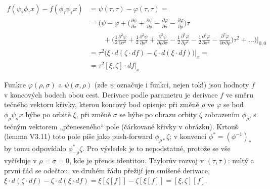 \begin{align*}
  f(\psi_\tau\phi_\tau x) - f(\phi_\tau\psi_\tau x) &= \psi(\tau,\tau) - \varphi(\tau,\tau) = \\
  &= \Big(\psi - \varphi + \Big(\frac{\partial\psi}{\partial\sigma} + \frac{\partial\psi}{\partial\rho}
     - \frac{\partial\varphi}{\partial\sigma} - \frac{\partial\varphi}{\partial\rho}\Big)\tau \\
  &\qquad + \Big(\frac12\frac{\partial^2\psi}{\partial\sigma^2} + \frac12\frac{\partial^2\psi}{\partial\rho^2}
     + \frac{\partial^2\psi}{\partial\rho\partial\sigma} - \frac12\frac{\partial^2\varphi}{\partial\rho^2}
     - \frac12\frac{\partial^2\varphi}{\partial\sigma^2} - \frac{\partial^2\varphi}{\partial\sigma\partial\rho}\Big)\tau^2 + \dots\Big)\Big|_{0,0} \\
  &= \tau^2\big(\xi\cdot d(\zeta\cdot df) - \zeta\cdot d(\xi\cdot df)\big)\big|_x = \\
  &= \tau^2[\xi,\zeta]\cdot df\big|_x
\end{align*}
\endgroup
{}

\begin{vysvetleni}
Funkce $\varphi(\rho,\sigma)$ a $\psi(\sigma,\rho)$ (zde $\psi$ označuje i funkci, nejen tok!) jsou hodnoty $f$ v koncových bodech obou cest. Derivace podle parametru je derivace $f$ ve směru tečného vektoru křivky, kterou koncový bod opisuje: při změně $\rho$ ve $\varphi$ se bod $\phi_\rho\psi_\sigma x$ hýbe po orbitě $\xi$, při změně $\sigma$ se hýbe po obrazu orbity $\zeta$ zobrazením $\phi_\rho$, s tečným vektorem „přeneseného“ pole (čárkované křivky v obrázku).
Krtouš (lemma V3.11) toto pole píše jako push-forward $\phi_{\rho*}\zeta$; v konvenci $\phi^*=(\phi^{-1})_*$ by tomu odpovídalo $\phi_{-\rho}^*\zeta$. Pro výsledek je to nepodstatné, protože se vše vyčísluje v $\rho=\sigma=0$, kde je přenos identitou.
Taylorův rozvoj v $(\tau,\tau)$: nultý a první řád se odečtou, ve druhém řádu přežijí jen smíšené derivace, $\xi\cdot d(\zeta\cdot df)-\zeta\cdot d(\xi\cdot df)=\xi[\zeta[f]]-\zeta[\xi[f]]=[\xi,\zeta][f]$.
\end{vysvetleni}

